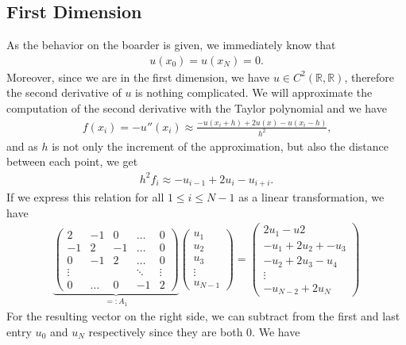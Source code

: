 \subsection{First Dimension}
As the behavior on the boarder is given, we immediately know that
\begin{align*}
    u(x_0) = u(x_N) = 0 \text{.}
\end{align*}
Moreover, since we are in the first dimension, we have \(u \in C^2(\mathbb{R}, \mathbb{R})\), therefore the second derivative of \(u\) is nothing complicated. We will approximate the computation of the second derivative with the Taylor polynomial and we have
\begin{align*}
    f(x_i) = -u''(x_i) \approx \frac{-u(x_i + h) + 2u(x) - u(x_i - h)}{h^2} \text{,}
\end{align*}
and as \(h\) is not only the increment of the approximation, but also the distance between each point, we get
\begin{align*}
    h^2 f_i \approx -u_{i - 1} + 2u_i - u_{i + i} \text{.}
\end{align*}
If we express this relation for all \(1 \leq i \leq N - 1\) as a linear transformation, we have
\begin{align*}
    \underbrace{
    \begin{pmatrix}
        2  & -1 &  0 & \dots & 0 \\
        -1 &  2 & -1 & \dots & 0 \\
        0  & -1 &  2 & \dots & 0 \\
        \vdots & & & \ddots & \vdots \\
        0 & \dots & 0 & -1 & 2
    \end{pmatrix}
    }_{=: A_1}
    \begin{pmatrix}
        u_1 \\ u_2 \\ u_3 \\ \vdots \\ u_{N-1}
    \end{pmatrix}
    =
    \begin{pmatrix}
        2u_1 - u2 \\
        -u_1 + 2u_2 + -u_3 \\
        -u_2 + 2 u_3 - u_4 \\
        \vdots \\
        -u_{N-2} + 2 u_N
    \end{pmatrix}
\end{align*}
For the resulting vector on the right side, we can subtract from the first and last entry \(u_0\) and \(u_N\) respectively since they are both \(0\). We have
